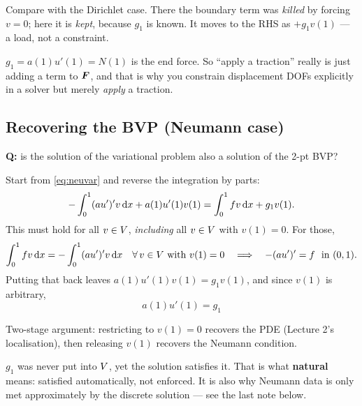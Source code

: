 \begin{intuition}
Compare with the Dirichlet case. There the boundary term was \emph{killed} by
forcing $v=0$; here it is \emph{kept}, because $g_{1}$ is known. It moves to the
RHS as $+g_{1}v(1)$ --- a load, not a constraint.

$g_{1}=a(1)u'(1)=N(1)$ is the end force. So ``apply a traction'' really is just
adding a term to $\bm{F}$, and that is why you constrain displacement DOFs
explicitly in a solver but merely \emph{apply} a traction.
\end{intuition}

\subsection*{Recovering the BVP (Neumann case)}

\textbf{Q:} is the solution of the variational problem also a solution of the
2-pt BVP?

Start from \eqref{eq:neuvar} and reverse the integration by parts:
\begin{equation}
  -\int_{0}^{1}(au')'v\,\mathrm{d} x + a(1)u'(1)v(1) = \int_{0}^{1} f v\,\mathrm{d} x + g_{1}v(1).
\end{equation}
This must hold for all $v\in V$, \emph{including} all $v\in V$ with
$v(1)=0$. For those,
\begin{equation}
  \int_{0}^{1} f v\,\mathrm{d} x = -\int_{0}^{1}(au')'v\,\mathrm{d} x
  \quad \forall\, v\in V \text{ with } v(1)=0
  \quad\Longrightarrow\quad -(au')'=f \ \text{ in } (0,1).
\end{equation}
Putting that back leaves $a(1)u'(1)v(1)=g_{1}v(1)$, and since $v(1)$ is
arbitrary,
\begin{equation}
  \boxed{\,a(1)u'(1)=g_{1}\,}
\end{equation}

\begin{intuition}
Two-stage argument: restricting to $v(1)=0$ recovers the PDE (Lecture 2's
localisation), then releasing $v(1)$ recovers the Neumann condition.

$g_{1}$ was never put into $V$, yet the solution satisfies it. That is what
\textbf{natural} means: satisfied automatically, not enforced. It is also why
Neumann data is only met approximately by the discrete solution --- see the last
note below.
\end{intuition}

